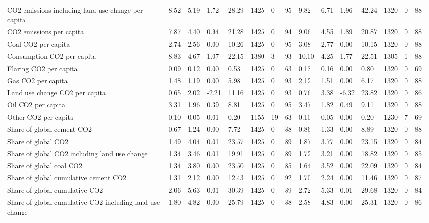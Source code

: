 \begin{longtable}{lllllllllllllll}
CO2 emissions including land use change per capita & 8.52 & 5.19 & 1.72 & 28.29 & 1425 & 0 & 95 & 9.82 & 6.71 & 1.96 & 42.24 & 1320 & 0 & 88\\
CO2 emissions per capita & 7.87 & 4.40 & 0.94 & 21.28 & 1425 & 0 & 94 & 9.06 & 4.55 & 1.89 & 20.87 & 1320 & 0 & 88\\
Coal CO2 per capita & 2.74 & 2.56 & 0.00 & 10.26 & 1425 & 0 & 95 & 3.08 & 2.77 & 0.00 & 10.15 & 1320 & 0 & 88\\
Consumption CO2 per capita & 8.83 & 4.67 & 1.07 & 22.15 & 1380 & 3 & 93 & 10.00 & 4.25 & 1.77 & 22.51 & 1305 & 1 & 88\\
\addlinespace
Flaring CO2 per capita & 0.09 & 0.12 & 0.00 & 0.53 & 1425 & 0 & 63 & 0.13 & 0.16 & 0.00 & 0.80 & 1320 & 0 & 69\\
Gas CO2 per capita & 1.48 & 1.19 & 0.00 & 5.98 & 1425 & 0 & 93 & 2.12 & 1.51 & 0.00 & 6.17 & 1320 & 0 & 88\\
Land use change CO2 per capita & 0.65 & 2.02 & -2.21 & 11.16 & 1425 & 0 & 93 & 0.76 & 3.38 & -6.32 & 23.82 & 1320 & 0 & 86\\
Oil CO2 per capita & 3.31 & 1.96 & 0.39 & 8.81 & 1425 & 0 & 95 & 3.47 & 1.82 & 0.49 & 9.11 & 1320 & 0 & 88\\
Other CO2 per capita & 0.10 & 0.05 & 0.01 & 0.20 & 1155 & 19 & 63 & 0.10 & 0.05 & 0.00 & 0.20 & 1230 & 7 & 69\\
\addlinespace
Share of global cement CO2 & 0.67 & 1.24 & 0.00 & 7.72 & 1425 & 0 & 88 & 0.86 & 1.33 & 0.00 & 8.89 & 1320 & 0 & 88\\
Share of global CO2 & 1.49 & 4.04 & 0.01 & 23.57 & 1425 & 0 & 89 & 1.87 & 3.77 & 0.00 & 23.15 & 1320 & 0 & 84\\
Share of global CO2 including land use change & 1.34 & 3.46 & 0.01 & 19.91 & 1425 & 0 & 89 & 1.72 & 3.21 & 0.00 & 18.82 & 1320 & 0 & 85\\
Share of global coal CO2 & 1.34 & 3.80 & 0.00 & 23.50 & 1425 & 0 & 85 & 1.64 & 3.52 & 0.00 & 22.09 & 1320 & 0 & 84\\
Share of global cumulative cement CO2 & 1.31 & 2.12 & 0.00 & 12.43 & 1425 & 0 & 92 & 1.70 & 2.24 & 0.00 & 11.46 & 1320 & 0 & 87\\
\addlinespace
Share of global cumulative CO2 & 2.06 & 5.63 & 0.01 & 30.39 & 1425 & 0 & 89 & 2.72 & 5.33 & 0.01 & 29.68 & 1320 & 0 & 84\\
Share of global cumulative CO2 including land use change & 1.80 & 4.82 & 0.00 & 25.79 & 1425 & 0 & 88 & 2.58 & 4.83 & 0.00 & 25.31 & 1320 & 0 & 86\\

\end{longtable}
